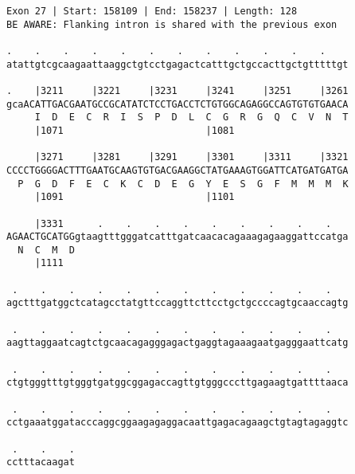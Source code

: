 \documentclass{article}
\begin{document}
\begin{Verbatim}
Exon 27 | Start: 158109 | End: 158237 | Length: 128
BE AWARE: Flanking intron is shared with the previous exon
 
.    .    .    .    .    .    .    .    .    .    .    .    
atattgtcgcaagaattaaggctgtcctgagactcatttgctgccacttgctgtttttgt
  
.    |3211     |3221     |3231     |3241     |3251     |3261
gcaACATTGACGAATGCCGCATATCTCCTGACCTCTGTGGCAGAGGCCAGTGTGTGAACA
     I  D  E  C  R  I  S  P  D  L  C  G  R  G  Q  C  V  N  T
     |1071                         |1081                    
  
     |3271     |3281     |3291     |3301     |3311     |3321
CCCCTGGGGACTTTGAATGCAAGTGTGACGAAGGCTATGAAAGTGGATTCATGATGATGA
  P  G  D  F  E  C  K  C  D  E  G  Y  E  S  G  F  M  M  M  K
     |1091                         |1101                    
  
     |3331      .    .    .    .    .    .    .    .    .   
AGAACTGCATGGgtaagtttgggatcatttgatcaacacagaaagagaaggattccatga
  N  C  M  D                                                
     |1111                                                  
  
 .    .    .    .    .    .    .    .    .    .    .    .   
agctttgatggctcatagcctatgttccaggttcttcctgctgccccagtgcaaccagtg
  
 .    .    .    .    .    .    .    .    .    .    .    .   
aagttaggaatcagtctgcaacagagggagactgaggtagaaagaatgagggaattcatg
  
 .    .    .    .    .    .    .    .    .    .    .    .   
ctgtgggtttgtgggtgatggcggagaccagttgtgggcccttgagaagtgattttaaca
  
 .    .    .    .    .    .    .    .    .    .    .    .   
cctgaaatggatacccaggcggaagagaggacaattgagacagaagctgtagtagaggtc
  
 .    .    .
cctttacaagat
\end{Verbatim}
\newpage
\end{document}
